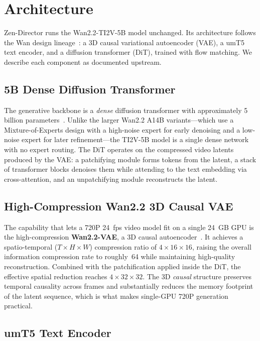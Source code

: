 \documentclass[11pt,a4paper]{article}
\begin{document}
\section{Architecture}

Zen-Director runs the Wan2.2-TI2V-5B model unchanged. Its architecture follows the Wan design
lineage~\cite{wan21paper,wan22github}: a 3D causal variational autoencoder (VAE), a umT5 text
encoder, and a diffusion transformer (DiT), trained with flow matching. We describe each
component as documented upstream.

\subsection{5B Dense Diffusion Transformer}

The generative backbone is a \emph{dense} diffusion transformer with approximately 5 billion
parameters~\cite{wan22hf,wan22github}. Unlike the larger Wan2.2 A14B variants---which use a
Mixture-of-Experts design with a high-noise expert for early denoising and a low-noise expert
for later refinement---the TI2V-5B model is a single dense network with no expert routing. The
DiT operates on the compressed video latents produced by the VAE: a patchifying module forms
tokens from the latent, a stack of transformer blocks denoises them while attending to the text
embedding via cross-attention, and an unpatchifying module reconstructs the latent.

\subsection{High-Compression Wan2.2 3D Causal VAE}

The capability that lets a 720P 24~fps video model fit on a single 24~GB GPU is the
high-compression \textbf{Wan2.2-VAE}, a 3D causal autoencoder~\cite{wan22github,wan22hf}. It
achieves a spatio-temporal ($T\times H\times W$) compression ratio of $4\times16\times16$,
raising the overall information compression rate to roughly~64 while maintaining high-quality
reconstruction. Combined with the patchification applied inside the DiT, the effective spatial
reduction reaches $4\times32\times32$. The 3D \emph{causal} structure preserves temporal
causality across frames and substantially reduces the memory footprint of the latent sequence,
which is what makes single-GPU 720P generation practical.

\subsection{umT5 Text Encoder}
\end{document}
